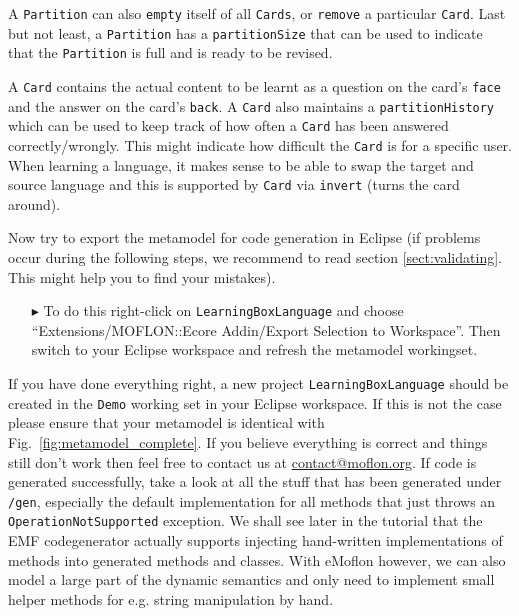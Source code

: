 A \texttt{Partition} can also \texttt{empty} itself of all \texttt{Cards}, or \texttt{remove} a particular \texttt{Card}.
Last but not least, a \texttt{Partition} has a \texttt{partitionSize} that can be used to indicate that the \texttt{Partition} is full and is ready to be revised.

A \texttt{Card} contains the actual content to be learnt as a question on the card's \texttt{face} and the answer on the card's \texttt{back}.
A \texttt{Card} also maintains a \texttt{partition\-History} which can be used to keep track of how often a \texttt{Card} has been answered correctly/wrongly.
This might indicate how difficult the \texttt{Card} is for a specific user.
When learning a language, it makes sense to be able to swap the target and source language and this is supported by \texttt{Card} via \texttt{invert} (turns the card around).

Now try to export the metamodel for code generation in Eclipse (if problems occur during the following steps, we recommend to read section \ref{sect:validating}. This might help you to find your mistakes).

\begin{enumerate}
\item[$\blacktriangleright$] To do this right-click on \texttt{LearningBoxLanguage} and choose ``Extensions/MOFLON::Ecore Addin/Export Selection to Workspace''.
Then switch to your Eclipse work\-space and refresh the metamodel workingset.
\end{enumerate}


If you have done everything right, a new project \texttt{LearningBoxLanguage} should be created in the \texttt{Demo} working set in your Eclipse workspace.
If this is not the case please ensure that your metamodel is identical with Fig.~\ref{fig:metamodel_complete}.
If you believe everything is correct and things still don't work then feel free to contact us at \href{mailto:contact@moflon.org}{contact@moflon.org}.
If code is generated successfully, take a look at all the stuff that has been generated under \texttt{/gen}, especially the default  implementation for all methods that just throws an  \texttt{OperationNotSupported} exception.
We shall see later in the tutorial that the EMF codegenerator actually supports injecting hand-written implementations of methods into generated methods and classes.
With eMoflon however, we can also model a large part of the dynamic semantics and only need to implement small helper methods for e.g. string manipulation by hand.

